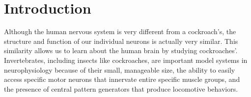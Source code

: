 \section{Introduction}


Although the human nervous system is very different from a cockroach’s, the structure and function of our individual neurons is actually very similar. This similarity allows us to learn about the human brain by studying cockroaches'. Invertebrates, including insects like cockroaches, are important model systems in neurophysiology because of their small, manageable size, the ability to easily access specific motor neurons that innervate entire specific muscle groups, and the presence of central pattern generators that produce locomotive behaviors. 


